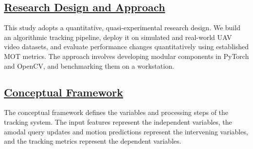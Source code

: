 \documentclass[12pt]{article}
\begin{document}
\subsection*{\underline{\textbf{Research Design and Approach}}}
This study adopts a quantitative, quasi-experimental research design. We build an algorithmic tracking pipeline, deploy it on simulated and real-world UAV video datasets, and evaluate performance changes quantitatively using established MOT metrics. The approach involves developing modular components in PyTorch and OpenCV, and benchmarking them on a workstation.

\subsection*{\underline{\textbf{Conceptual Framework}}}
The conceptual framework defines the variables and processing steps of the tracking system. The input features represent the independent variables, the amodal query updates and motion predictions represent the intervening variables, and the tracking metrics represent the dependent variables.
\end{document}
